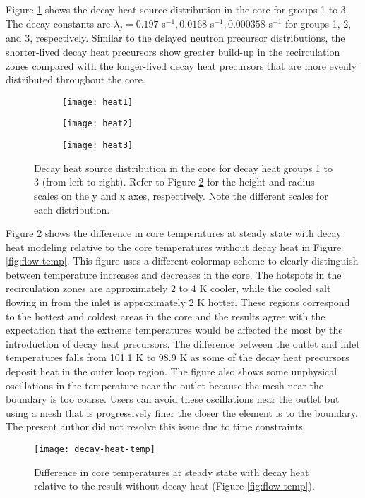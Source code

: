 Figure \ref{fig:decayheat} shows the decay heat source distribution in the
core for groups 1 to 3. The decay constants are $\lambda_j = 0.197$ s$^{-1},
0.0168$ s$^{-1}, 0.000358$ s$^{-1}$ for groups 1, 2, and 3, respectively.
Similar to the delayed neutron precursor distributions, the shorter-lived
decay heat precursors show greater build-up in the recirculation zones
compared with the longer-lived decay heat precursors that are more evenly
distributed throughout the core.

\begin{figure}[htbp!]
    \centering
    \begin{subfigure}[t]{.325\textwidth}
        \centering
        \texttt{[image: heat1]}
    \end{subfigure}
    \begin{subfigure}[t]{.325\textwidth}
        \centering
        \texttt{[image: heat2]}
    \end{subfigure}
    \begin{subfigure}[t]{.325\textwidth}
        \centering
        \texttt{[image: heat3]}
    \end{subfigure}
    \caption{Decay heat source distribution in the core for decay heat groups
    1 to 3 (from left to right). Refer to Figure \ref{fig:decayheattemp} for
    the height and radius scales on the y and x axes, respectively. Note the
    different scales for each distribution.}
    \label{fig:decayheat}
\end{figure}

Figure \ref{fig:decayheattemp} shows the
difference in core temperatures at steady state with decay heat modeling
relative to the core temperatures without decay heat in Figure
\ref{fig:flow-temp}. This figure uses a different colormap scheme to clearly
distinguish between temperature increases and decreases in the core. The
hotspots in the recirculation zones are approximately
2 to 4 K cooler, while the cooled salt flowing in from the inlet is
approximately 2 K hotter. These regions correspond to the hottest and coldest
areas in the core and the results agree with the expectation that the extreme
temperatures would be affected the most by the introduction of decay heat
precursors. The difference between the outlet and inlet temperatures falls
from 101.1 K to 98.9 K as some of the decay heat precursors deposit heat in
the outer loop region. The figure also shows some unphysical oscillations in
the temperature near the outlet because the mesh near the boundary is too
coarse. Users can avoid these oscillations near the outlet but using a mesh
that is progressively finer the closer the element is to the boundary. The
present author did not resolve this issue due to time constraints.

\begin{figure}[htbp!]
    \centering
    \texttt{[image: decay-heat-temp]}
    \caption{Difference in core temperatures at steady state with decay heat
    relative to the result without decay heat (Figure \ref{fig:flow-temp}).}
    \label{fig:decayheattemp}
\end{figure}
